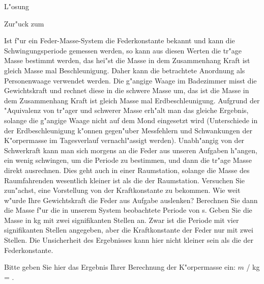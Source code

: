 \begin{MExercises}
\begin{MExercise}
\begin{MHint}{L"osung}
\end{MHint}

Zur"uck zum 
\end{MExercise}

\begin{MExercise}
Ist f"ur ein Feder-Masse-System die Federkonstante bekannt und kann die Schwingungsperiode gemessen werden, so kann aus diesen Werten die tr"age Masse bestimmt werden, das hei"st die Masse in dem Zusammenhang \glqq Kraft ist gleich Masse mal Beschleunigung\grqq. Daher kann die betrachtete Anordnung als Personenwaage verwendet werden. Die g"angige Waage im Badezimmer misst die Gewichtskraft und rechnet diese in die schwere Masse um, das ist die Masse in dem Zusammenhang \glqq Kraft ist gleich Masse mal Erdbeschleunigung\grqq. Aufgrund der "Aquivalenz von tr"ager und schwerer Masse erh"alt man das gleiche Ergebnis, solange die g"angige Waage nicht auf dem Mond eingesetzt wird (Unterschiede in der Erdbeschleunigung k"onnen gegen"uber Messfehlern und Schwankungen der K"orpermasse im Tagesverlauf vernachl"assigt werden). Unabh"angig von der Schwerkraft kann man sich morgens an die Feder aus unseren Aufgaben h"angen, ein wenig schwingen, um die Periode zu bestimmen, und dann die tr"age Masse direkt ausrechnen. Dies geht auch in einer Raumstation, solange die Masse des Raumfahrenden wesentlich kleiner ist als die der Raumstation. 
Versuchen Sie zun"achst, eine Vorstellung von der Kraftkonstante zu bekommen. Wie weit w"urde Ihre Gewichtskraft die Feder aus Aufgabe  auslenken? Berechnen Sie dann die Masse f"ur die in unserem System beobachtete Periode von  s. Geben Sie die Masse in kg mit zwei signifikanten Stellen an. Zwar ist die Periode mit vier signifikanten Stellen angegeben, aber die Kraftkonstante der Feder nur mit zwei Stellen. Die Unsicherheit des Ergebnisses kann hier nicht kleiner sein als die der Federkonstante.

Bitte geben Sie hier das Ergebnis Ihrer Berechnung der K"orpermasse ein: $m$ / kg =  .


\end{MExercise}
\end{MExercises}
